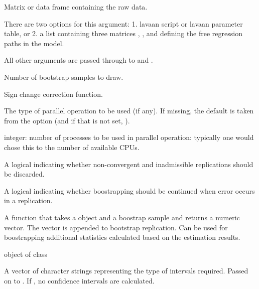 \documentclass[a4paper]{book}
\begin{document}
\begin{Arguments}
\begin{ldescription}
\item[\code{data}] Matrix or data frame containing the raw data.

\item[\code{model}] There are two options for this argument: 1. lavaan script or lavaan parameter
table, or 2. a list containing three matrices
, , and  defining the free regression paths
in the model.

\item[\code{...}] All other arguments are passed through to  and .

\item[\code{R}] Number of bootstrap samples to draw.

\item[\code{signChange}] Sign change correction function.

\item[\code{parallel}] 
The type of parallel operation to be used (if any).  If missing, the
default is taken from the option  (and if that
is not set, ).


\item[\code{ncpus}] 
integer: number of processes to be used in parallel operation:
typically one would chose this to the number of available CPUs.


\item[\code{dropInadmissible}] A logical indicating whether non-convergent and inadmissible replications
should be discarded.

\item[\code{stopOnError}] A logical indicating whether boostrapping should be continued when error occurs
in a replication.

\item[\code{extraFun}] A function that takes a  object and a boostrap sample and returns a numeric vector. The
vector is appended to bootstrap replication. Can be used for boostrapping additional
statistics calculated based on the estimation results.

\item[\code{object}] object of class 

\item[\code{ci.type}] A vector of character strings representing the type of intervals required. Passed on to . If , 
no confidence intervals are calculated.
\end{ldescription}
\end{Arguments}
\end{document}
